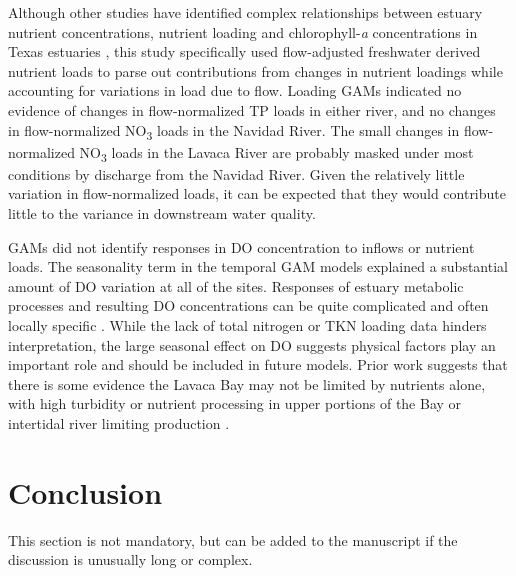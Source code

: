 \documentclass[water,article,submit,oneauthor]{Definitions/mdpi}
\begin{document}
Although other studies have identified complex relationships between
estuary nutrient concentrations, nutrient loading and
chlorophyll-\emph{a} concentrations in Texas estuaries
\citep{ornolfsdottirNutrientPulsingRegulator2004, doradoUnderstandingInteractionsFreshwater2015, ciraPhytoplanktonDynamicsLowInflow2021, tominackVariabilityPhytoplanktonBiomass2022},
this study specifically used flow-adjusted freshwater derived nutrient
loads to parse out contributions from changes in nutrient loadings while
accounting for variations in load due to flow. Loading GAMs indicated no
evidence of changes in flow-normalized TP loads in either river, and no
changes in flow-normalized NO\textsubscript{3} loads in the Navidad
River. The small changes in flow-normalized NO\textsubscript{3} loads in
the Lavaca River are probably masked under most conditions by discharge
from the Navidad River. Given the relatively little variation in
flow-normalized loads, it can be expected that they would contribute
little to the variance in downstream water quality.

GAMs did not identify responses in DO concentration to inflows or
nutrient loads. The seasonality term in the temporal GAM models
explained a substantial amount of DO variation at all of the sites.
Responses of estuary metabolic processes and resulting DO concentrations
can be quite complicated and often locally specific
\citep{caffreyFactorsControllingNet2004}. While the lack of total
nitrogen or TKN loading data hinders interpretation, the large seasonal
effect on DO suggests physical factors play an important role and should
be included in future models. Prior work suggests that there is some
evidence the Lavaca Bay may not be limited by nutrients alone, with high
turbidity or nutrient processing in upper portions of the Bay or
intertidal river limiting production \citep{russell_effect_2006}.

\hypertarget{conclusion}{%
\section{Conclusion}\label{conclusion}}

This section is not mandatory, but can be added to the manuscript if the
discussion is unusually long or complex.


\vspace{6pt}

\end{document}
